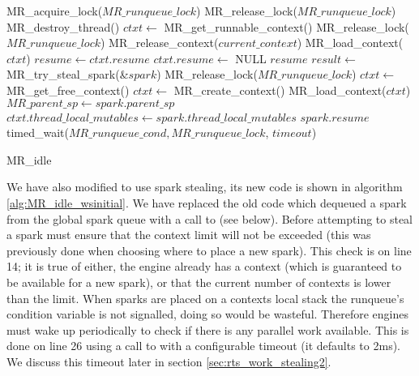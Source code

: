 \begin{algorithm}
\begin{algorithmic}[1]
  \State MR\_acquire\_lock($MR\_runqueue\_lock$)
  \Loop
      \State MR\_release\_lock($MR\_runqueue\_lock$)
      \State MR\_destroy\_thread()
    \EndIf
    \State $ctxt \gets$ MR\_get\_runnable\_context()
      \State MR\_release\_lock($MR\_runqueue\_lock$)
        \State MR\_release\_context($current\_context$)
      \EndIf
      \State MR\_load\_context($ctxt$)
      \State $resume \gets ctxt.resume$
      \State $ctxt.resume \gets$ NULL
      \Goto $resume$
    \EndIf
      \State $result \gets$ MR\_try\_steal\_spark(\&$spark$)
        \State MR\_release\_lock($MR\_runqueue\_lock$)
          \State $ctxt \gets$ MR\_get\_free\_context()
            \State $ctxt \gets$ MR\_create\_context()
          \EndIf
          \State MR\_load\_context($ctxt$)
        \EndIf
        \State $MR\_parent\_sp \gets spark.parent\_sp$
        \State $ctxt.thread\_local\_mutables \gets
          spark.thread\_local\_mutables$
        \Goto $spark.resume$
      \EndIf
    \EndIf
    \State timed\_wait($MR\_runqueue\_cond, MR\_runqueue\_lock$, $timeout$)
  \EndLoop
\EndProcedure
\end{algorithmic}
\caption{MR\_idle}
\label{alg:MR_idle_wsinitial}
\end{algorithm}

We have also modified \idle to use spark stealing,
its new code is shown in algorithm \ref{alg:MR_idle_wsinitial}.
We have replaced the old code which dequeued a spark from the global spark
queue
with a call to \trystealspark (see below).
Before attempting to steal a spark \idle must ensure that the context limit
will not be exceeded
(this was previously done when choosing where to place a new spark).
This check is on line 14; it is true of either,
the engine already has a context (which is guaranteed to be available for a
new spark),
or that the current number of contexts is lower than the limit.
When sparks are placed on a contexts local stack the runqueue's condition
variable is not signalled,
doing so would be wasteful.
Therefore engines must wake up periodically to check if there is any
parallel work available.
This is done on line 26 using a call to  with a
configurable timeout (it defaults to 2ms).
We discuss this timeout later in section \ref{sec:rts_work_stealing2}.

